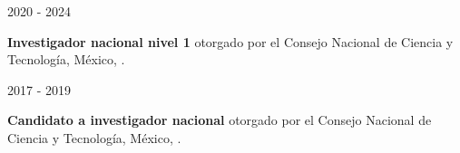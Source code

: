 
\begin{minipage}{1.5 in}
	2020 - 2024\\
\end{minipage}
\begin{minipage}{4.5in}
	\textbf{Investigador nacional nivel 1} otorgado por el Consejo Nacional de Ciencia y Tecnología, México, \href{https://www.dropbox.com/s/gasskc02vezprb8/2019_sni_vasquez.pdf?dl=0}{\faFilePdfO}.\\ 
\end{minipage}


\begin{minipage}{1.5 in}
	2017 - 2019\\
\end{minipage}
\begin{minipage}{4.5in}
	\textbf{Candidato a investigador nacional} otorgado por el Consejo Nacional de Ciencia y Tecnología, México, \href{https://www.dropbox.com/s/37igr1yucjupmfp/2016_sni_vasquez.pdf?dl=0}{\faFilePdfO}.\\ 
\end{minipage}

